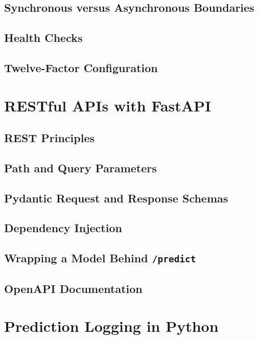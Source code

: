 \subsection{Synchronous versus Asynchronous Boundaries}

\subsection{Health Checks}

\subsection{Twelve-Factor Configuration}

\section{RESTful APIs with FastAPI}
\label{sec:fastapi}

\subsection{REST Principles}

\subsection{Path and Query Parameters}

\subsection{Pydantic Request and Response Schemas}

\subsection{Dependency Injection}

\subsection{Wrapping a Model Behind \texttt{/predict}}

\subsection{OpenAPI Documentation}

\section{Prediction Logging in Python}
\label{sec:prediction-logging}

